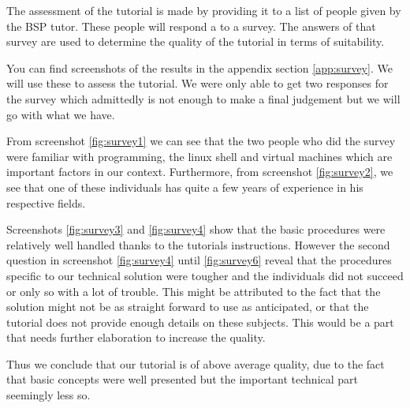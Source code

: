 
The assessment of the tutorial is made by providing it to a list of
people given by the BSP tutor. These people will respond a to a
survey.  The answers of that survey are used to determine the quality
of the tutorial in terms of suitability.

You can find screenshots of the results in the appendix section
\ref{app:survey}. We will use these to assess the tutorial. We were
only able to get two responses for the survey which admittedly is not
enough to make a final judgement but we will go with what we have.

From screenshot \ref{fig:survey1} we can see that the two people who
did the survey were familiar with programming, the linux shell and
virtual machines which are important factors in our context.
Furthermore, from screenshot \ref{fig:survey2}, we see that one of
these individuals has quite a few years of experience in his
respective fields.

Screenshots \ref{fig:survey3} and \ref{fig:survey4} show that the
basic procedures were relatively well handled thanks to the tutorials
instructions. However the second question in screenshot
\ref{fig:survey4} until \ref{fig:survey6} reveal that the procedures
specific to our technical solution were tougher and the individuals
did not succeed or only so with a lot of trouble.  This might be
attributed to the fact that the solution might not be as straight
forward to use as anticipated, or that the tutorial does not provide
enough details on these subjects. This would be a part that needs
further elaboration to increase the quality.

Thus we conclude that our tutorial is of above average quality, due to
the fact that basic concepts were well presented but the important
technical part seemingly less so.
